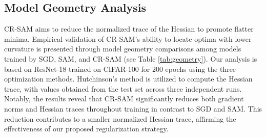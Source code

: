 \documentclass[letterpaper]{article} %
\theoremstyle{plain}
\theoremstyle{definition}
\begin{document}
\begin{table}[h]
    \centering
    \small
    \caption{Results on ImageNet-1k/-C/-R, the base optimizer for ResNets and ViTs
are SGD+M and AdamW, respectively.}
    \label{tab:imagenet}
\end{table}

\subsection{Model Geometry Analysis}
\label{subsec:eigenvalue}
CR-SAM aims to reduce the normalized trace of the Hessian to promote flatter minima. Empirical validation of CR-SAM's ability to locate optima with lower curvature is presented through model geometry comparisons among models trained by SGD, SAM, and CR-SAM (see Table \ref{tab:geometry}). Our analysis is based on ResNet-18 trained on CIFAR-100 for 200 epochs using the three optimization methods. Hutchinson’s method \cite{avron2011randomized, yao2020pyhessian} is utilized to compute the Hessian trace, with values obtained from the test set across three independent runs. Notably, the results reveal that CR-SAM significantly reduces both gradient norms and Hessian traces throughout training in contrast to SGD and SAM. This reduction contributes to a smaller normalized Hessian trace, affirming the effectiveness of our proposed regularization strategy.
\end{document}

